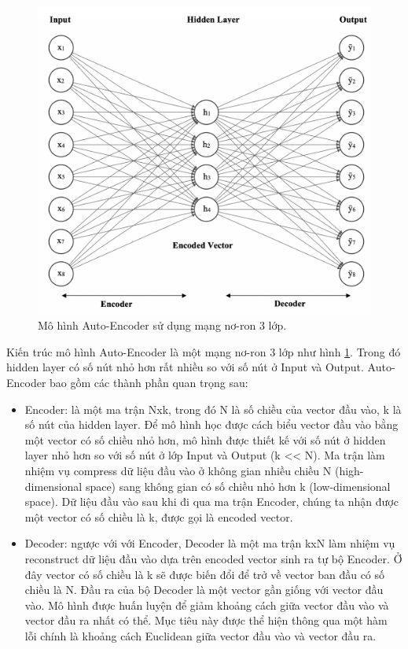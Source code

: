 \begin{figure}[h!]
\begin{center}
	\includegraphics[width=1.0\textwidth]{books/artificial-neural-network/chapter04/figure/auto-encoder-architecture.png}
	\caption{Mô hình Auto-Encoder sử dụng mạng nơ-ron 3 lớp.}
	\label{fig:auto-encoder-architecture}
\end{center}
\end{figure}

Kiến trúc mô hình Auto-Encoder là một mạng nơ-ron 3 lớp như hình \ref{fig:auto-encoder-architecture}. Trong đó hidden layer có số nút nhỏ hơn rất nhiều so với số nút ở Input và Output. Auto-Encoder bao gồm các thành phần quan trọng sau:

\begin{itemize}
    \item Encoder: là một ma trận Nxk, trong đó N là số chiều của vector đầu vào, k là số nút của hidden layer. Để mô hình  học được cách biểu vector đầu vào bằng một vector có số chiều nhỏ hơn, mô hình được thiết kế với số nút ở hidden layer nhỏ hơn so với số nút ở lớp Input và Output (k << N). Ma trận làm nhiệm vụ compress dữ liệu đầu vào ở không gian nhiều chiều N (high-dimensional space) sang không gian có số chiều nhỏ hơn k (low-dimensional space). Dữ liệu đầu vào sau khi đi qua ma trận Encoder, chúng ta nhận được một vector có số chiều là k, được gọi là encoded vector.
    \item Decoder: ngược với với Encoder, Decoder là một ma trận kxN làm nhiệm vụ reconstruct dữ liệu đầu vào dựa trên encoded vector sinh ra tự bộ Encoder. Ở đây vector có số chiều là k sẽ được biến đổi để trở về vector ban đầu có số chiều là N. Đầu ra của bộ Decoder là một vector gần giống với vector đầu vào. Mô hình được huấn luyện để giảm khoảng cách giữa vector đầu vào và vector đầu ra nhất có thể. Mục tiêu này được thể hiện thông qua một hàm lỗi chính là khoảng cách Euclidean giữa vector đầu vào và vector đầu ra.
\end{itemize}

